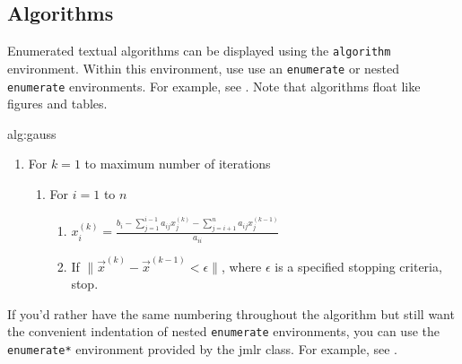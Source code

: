 \documentclass[mlabstract]{jmlr}
\begin{document}
\subsection{Algorithms}
\label{sec:algorithms}

Enumerated textual algorithms can be displayed using the
\texttt{algorithm} environment. Within this environment, use
use an \texttt{enumerate} or nested \texttt{enumerate} environments.
For example, see . Note that algorithms
float like figures and tables.

\begin{algorithm}[htbp]
\floatconts
{alg:gauss}%
{\caption{The Gauss-Seidel Algorithm}}
{%
\begin{enumerate}
  \item For $k=1$ to maximum number of iterations
    \begin{enumerate}
      \item For $i=1$ to $n$
        \begin{enumerate}
        \item $x_i^{(k)} = 
          \frac{b_i - \sum_{j=1}^{i-1}a_{ij}x_j^{(k)}
          - \sum_{j=i+1}^{n}a_{ij}x_j^{(k-1)}}{a_{ii}}$
        \item If $\|\vec{x}^{(k)}-\vec{x}^{(k-1)} < \epsilon\|$,
          where $\epsilon$ is a specified stopping criteria, stop.
      \end{enumerate}
    \end{enumerate}
\end{enumerate}
}
\end{algorithm}

If you'd rather have the same numbering throughout the algorithm
but still want the convenient indentation of nested 
\texttt{enumerate} environments, you can use the
\texttt{enumerate*} environment provided by the \textsf{jmlr}
class. For example, see .
\end{document}
